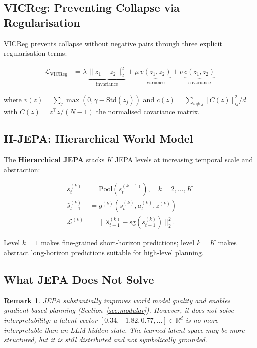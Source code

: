 \documentclass[10pt,twocolumn]{article}
\newtheorem{remark}{Remark}
\begin{document}
\subsection{VICReg: Preventing Collapse via Regularisation}

VICReg \citep{bardes2022vicreg} prevents collapse without negative pairs
through three explicit regularisation terms:

\begin{align}
  \mathcal{L}_{\text{VICReg}} &= \lambda\, \underbrace{\|z_1 - z_2\|_2^2}_{\text{invariance}}
  + \mu\, \underbrace{v(z_1, z_2)}_{\text{variance}}
  + \nu\, \underbrace{c(z_1, z_2)}_{\text{covariance}}
  \label{eq:vicreg}
\end{align}

\noindent where $v(z) = \sum_j \max(0, \gamma - \text{Std}(z_j))$ and
$c(z) = \sum_{i \neq j} [C(z)]_{ij}^2 / d$ with
$C(z) = z^\top z / (N-1)$ the normalised covariance matrix.

\subsection{H-JEPA: Hierarchical World Model}

The \textbf{Hierarchical JEPA} stacks $K$ JEPA levels at increasing
temporal scale and abstraction:

\begin{align}
  s^{(k)}_t &= \text{Pool}(s^{(k-1)}_t), \quad k = 2, \ldots, K
  \label{eq:hjepa_pool}\\
  \hat{s}^{(k)}_{t+1} &= g^{(k)}(s^{(k)}_t, a^{(k)}_t, z^{(k)})
  \label{eq:hjepa_pred}\\
  \mathcal{L}^{(k)} &= \|\hat{s}^{(k)}_{t+1} - \text{sg}(s^{(k)}_{t+1})\|_2^2.
  \label{eq:hjepa_loss}
\end{align}

\noindent Level $k=1$ makes fine-grained short-horizon predictions;
level $k=K$ makes abstract long-horizon predictions suitable for
high-level planning.

\subsection{What JEPA Does Not Solve}

\begin{remark}
JEPA substantially improves world model quality and enables gradient-based
planning (Section~\ref{sec:modular}).  However, it does \emph{not} solve
interpretability: a latent vector $[0.34, -1.82, 0.77, \ldots] \in \mathbb{R}^d$
is no more interpretable than an LLM hidden state.  The learned latent
space may be more structured, but it is still distributed and not
symbolically grounded.
\end{remark}
\end{document}
